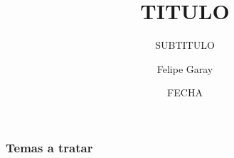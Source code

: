 \documentclass[t]{beamer}
\title{TITULO}
\subtitle{SUBTITULO}
\author{Felipe Garay}
\institute{USACH}
\date{FECHA}
\begin{document}
\begin{frame}
\titlepage
\end{frame}

\begin{frame}
\frametitle{Temas a tratar}
\tableofcontents
\end{frame}


\end{document}
